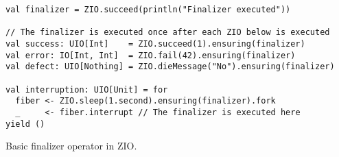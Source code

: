 \begin{algorithm}

\begin{verbatim}
val finalizer = ZIO.succeed(println("Finalizer executed"))

// The finalizer is executed once after each ZIO below is executed
val success: UIO[Int]    = ZIO.succeed(1).ensuring(finalizer)
val error: IO[Int, Int]  = ZIO.fail(42).ensuring(finalizer)
val defect: UIO[Nothing] = ZIO.dieMessage("No").ensuring(finalizer)

val interruption: UIO[Unit] = for
  fiber <- ZIO.sleep(1.second).ensuring(finalizer).fork
  _     <- fiber.interrupt // The finalizer is executed here
yield ()
\end{verbatim}

\caption{Basic finalizer operator  in ZIO. \label{zio:finalizers}}
\end{algorithm}
